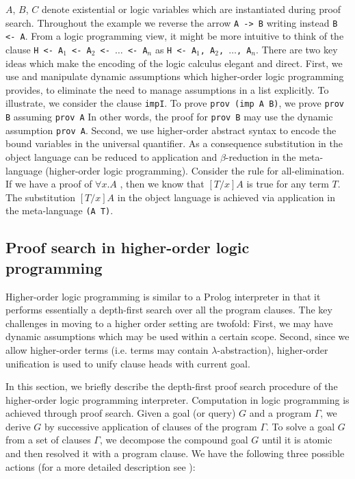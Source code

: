 \documentclass{llncs}
\newcommand{\z}{\mbox{}}
\begin{document}

$A$, $B$, $C$ denote existential or logic variables which are
instantiated during proof search. Throughout the example we reverse
the arrow {\tt{A -> B}} writing instead {\tt{B <- A}}. From a logic
programming view, it might be more intuitive to think of the clause
{\tt{H <- A$_1$ <- A$_2$ <- $\ldots$ <- A$_n$}} as {\tt{H <-
    A$_1$, A$_2$, $\ldots$, A$_n$}}. There are two key ideas which
make the encoding of the logic calculus elegant and direct.
First, we use and manipulate dynamic assumptions which higher-order
logic programming provides, to eliminate the need to manage
assumptions in a list explicitly. To illustrate, we consider the
clause {\tt impI}. To prove {\tt prov (imp A B)}, we prove {\tt prov
B} assuming {\tt prov A} In other words, the proof for {\tt prov B}
may use the dynamic assumption {\tt prov A}.
Second, we use higher-order abstract syntax to encode the bound
variables in the universal quantifier. As a consequence substitution
in the object language can be reduced to application and
$\beta$-reduction in the meta-language (higher-order logic
programming). Consider the rule for all-elimination. If we have a proof of
$\forall x.A$ , then we know that $[T/x]A$ is true for any term
$T$. The substitution $[T/x]A$ in the object language is achieved via
application in the meta-language {\tt (A T)}. 


\subsection{Proof search in higher-order logic programming}

Higher-order logic programming is similar to a Prolog interpreter in
that it performs essentially a depth-first search over all the program
clauses. The key challenges in moving to a higher order setting are
twofold: First, we may have dynamic assumptions which may be
used within a certain scope. Second, since we allow higher-order
terms (i.e. terms may contain $\lambda$-abstraction), higher-order
unification is used to unify clause heads with current goal. 

In this section,  we briefly describe the depth-first proof search
procedure of the higher-order logic programming
interpreter. Computation in logic programming is achieved through
proof search. Given a goal (or query) $G$ and a program $\Gamma$, we
derive $G$ by successive application of clauses of the program
$\Gamma$. 
To solve a goal $G$ from a set of clauses $\Gamma$, we decompose the
compound goal $G$ until it is atomic and then resolved it with a
program clause. We have the following three possible actions (for a
more detailed description see \cite{Miller91apal}):
\end{document}
